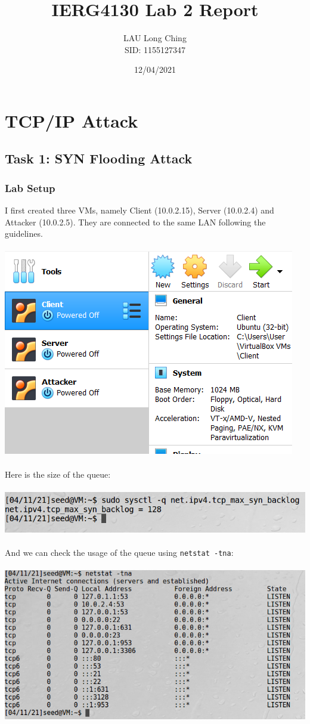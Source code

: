 \documentclass[a4paper]{article}
\title{\vspace{-1.5cm}IERG4130 Lab 2 Report}
\author{LAU Long Ching\\SID: 1155127347\\
        
}
\date{12/04/2021}
\begin{document}
\maketitle
\section{TCP/IP Attack}
\subsection{Task 1: SYN Flooding Attack}
\subsubsection{Lab Setup}
I first created three VMs, namely Client (10.0.2.15), Server (10.0.2.4) and Attacker (10.0.2.5). They are connected to the same LAN following the guidelines.\\\\
\includegraphics[scale=0.7]{1/1.png}\\\\
Here is the size of the queue:\\\\
\includegraphics[scale=0.7]{1/2.png}\\\\
And we can check the usage of the queue using \verb+netstat -tna+:\\\\
\includegraphics[scale=0.7]{1/3.png}\\\\
\pagebreak
\end{document}
